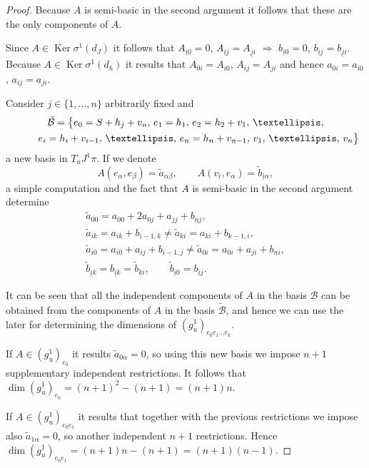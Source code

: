 \documentclass[11pt]{article}
\begin{document}
\begin{proof}
Because $A$ is semi-basic in the second argument it follows that
these are the only components of $A$.

Since $A\in\operatorname{Ker}\sigma^{1}(d_{J})$ it follows that $A_{\underline{i}0}=0$, $A_{\underline{i}j}=A_{\underline{j}i}$ $\Rightarrow$ $b_{\underline{i}0}=0$, $b_{\underline{i}j}=b_{\underline{j}i}$.
Because $A\in\operatorname{Ker}\sigma^{1}(d_{h})$ it results that
$A_{0i}=A_{i0}$, $A_{ij}=A_{ji}$ and hence $a_{0i}=a_{i0}$, $a_{ij}=a_{ji}$.

Consider $j\in \{1,\dots, n\} $ arbitrarily f\/ixed and
\begin{gather*}
\mathcal{\tilde{B}}=\big\{ e_{0}=S+h_{j}+v_{n},\, e_{1}=h_{1},\, e_{2}=h_{2}+v_{1}, \, \dots,\\
 \hphantom{\mathcal{\tilde{B}}=\big\{}{} e_{i}=h_{i}+v_{i-1},\, \dots,\, e_{n}=h_{n}+v_{n-1},\, v_{1},\, \dots,\, v_{n}\big\}
\end{gather*}
 a new basis in $T_{u}J^{1}\pi$. If we denote \[
A(e_{\alpha},e_{\beta})=\tilde{a}_{\alpha\beta},\qquad A(v_{i},e_{\alpha})=\tilde{b}_{\underline{i}\alpha},\]
 a simple computation and the fact that $A$ is semi-basic in the
second argument determine \begin{gather*}
\tilde{a}_{00}   =   a_{00}+2a_{0j}+a_{jj}+b_{\underline{n}j},\\
\tilde{a}_{ik}   =   a_{ik}+b_{\underline{i-1},k}\neq\tilde{a}_{ki}=a_{ki}+b_{\underline{k-1},i},\\
\tilde{a}_{i0}   =   a_{i0}+a_{ij}+b_{\underline{i-1},j}\neq\tilde{a}_{0i}=a_{0i}+a_{ji}+b_{\underline{n}i},\\
\tilde{b}_{\underline{i}k}   =b_{\underline{i}k}   =\tilde{b}_{\underline{k}i},\qquad
\tilde{b}_{\underline{i}0}   =   b_{\underline{i}j}.
\end{gather*}


It can be seen that all the independent components of $A$ in the
basis $\mathcal{B}$ can be obtained from the components of $A$ in
the basis $\mathcal{\tilde{B}}$, and hence we can use the later for
determining the dimensions of $(g_{u}^{1})_{e_{0} e_{1}\dots e_{k}}$.

If $A\in(g_{u}^{1})_{e_{0}}$ it results $\tilde{a}_{0\alpha}=0$,
so using this new basis we impose $n+1$ supplementary independent
restrictions. It follows that $\dim(g_{u}^{1})_{e_{0}}=(n+1)^{2}-(n+1)=(n+1)n$.

If $A\in(g_{u}^{1})_{e_{0} e_{1}}$ it results that together with
the previous restrictions we impose also $\tilde{a}_{1\alpha}=0$,
so another independent $n+1$ restrictions. Hence $\dim (g_{u}^{1})_{e_{0} e_{1}}=(n+1)n-(n+1)=(n+1)(n-1)$.


\end{proof}
\end{document}
